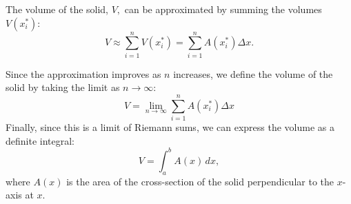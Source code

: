 \documentclass[handout]{ximera}
\begin{document}
The volume of the solid, $V,$ can be approximated by summing the volumes $V(x_i^*)$: %
\[
V \approx \sum_{i=1}^n V(x_i^*) = \sum_{i=1}^n A(x_i^*) \Delta x.
\]

Since the approximation improves as $n$ increases, we define the volume of the solid by taking the limit as $n \to \infty$:
\[
V = \lim_{n \to \infty} \sum_{i=1}^n A(x_i^*) \Delta x
\]
Finally, since this is a limit of Riemann sums, we can express the volume as a definite integral:
\[
V = \int_a^b A(x) \, dx,
\]
where $A(x)$ is the area of the cross-section of the solid perpendicular to the $x$-axis at $x$.
\end{document}
